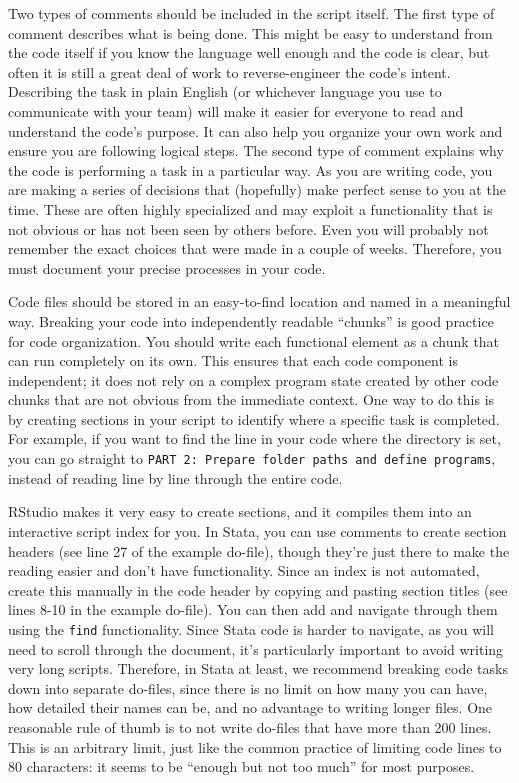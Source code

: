 Two types of comments should be included in the script itself.
The first type of comment describes what is being done.
This might be easy to understand from the code itself
if you know the language well enough and the code is clear,
but often it is still a great deal of work to reverse-engineer the code's intent.
Describing the task in plain English (or whichever language you use to communicate with your team)
will make it easier for everyone to read and understand the code's purpose.
It can also help you organize your own work and ensure you are following logical steps.
The second type of comment explains why the code is performing a task in a particular way.
As you are writing code, you are making a series of decisions that
(hopefully) make perfect sense to you at the time.
These are often highly specialized and may exploit a functionality
that is not obvious or has not been seen by others before.
Even you will probably not remember the exact choices that were made in a couple of weeks.
Therefore, you must document your precise processes in your code.

Code files should be stored in an easy-to-find location and named in a meaningful way.
Breaking your code into independently readable ``chunks'' is good practice for code organization.
You should write each functional element as a chunk that can run completely on its own.
This ensures that each code component is independent;
it does not rely on a complex program state
created by other code chunks that are not obvious from the immediate context.
One way to do this is by creating sections in your script to identify where a specific task is completed.
For example, if you want to find the line in your code where the directory is set,
you can go straight to \texttt{PART 2: Prepare folder paths and define programs},
instead of reading line by line through the entire code.

RStudio makes it very easy to create sections,
and it compiles them into an interactive script index for you.
In Stata, you can use comments to create section headers
(see line 27 of the example do-file),
though they're just there to make the reading easier and don't have functionality.
Since an index is not automated,
create this manually in the code header by copying and pasting section titles
(see lines 8-10 in the example do-file).
You can then add and navigate through them using the \texttt{find} functionality.
Since Stata code is harder to navigate, as you will need to scroll through the document,
it's particularly important to avoid writing very long scripts.
Therefore, in Stata at least, we recommend breaking code tasks down
into separate do-files, since there is no limit on how many you can have,
how detailed their names can be, and no advantage to writing longer files.
One reasonable rule of thumb is to not write do-files that have more than 200 lines.
This is an arbitrary limit, just like the common practice of limiting code lines to 80 characters:
it seems to be ``enough but not too much'' for most purposes.

